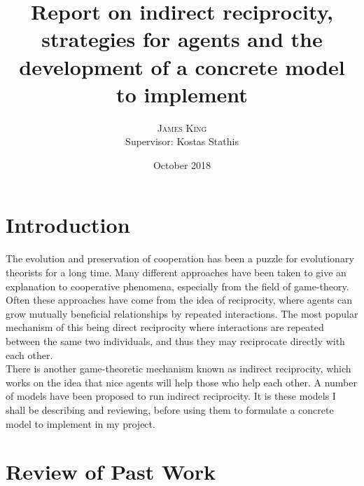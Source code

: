\documentclass[twoside,twocolumn]{article}
\title{ Report on indirect reciprocity, strategies for agents and the development of a concrete model to implement} %
\author{%
\textsc{James King} \\%
\normalsize Supervisor: Kostas Stathis \\ %
}
\date{October 2018} %
\begin{document}



\maketitle


\section{Introduction}
The evolution and preservation of cooperation has been a puzzle for evolutionary theorists for a long time. Many different approaches have been taken to give an explanation to cooperative phenomena, especially from the field of game-theory. Often these approaches have come from the idea of reciprocity, where agents can grow mutually beneficial relationships by repeated interactions. The most popular mechanism of this being direct reciprocity where interactions are repeated between the same two individuals, and thus they may reciprocate directly with each other.\\
There is another game-theoretic mechanism known as indirect reciprocity, which works on the idea that nice agents will help those who help each other. A number of models have been proposed to run indirect reciprocity. It is these models I shall be describing and reviewing, before using them to formulate a concrete model to implement in my project.



\section{Review of Past Work}
\end{document}
